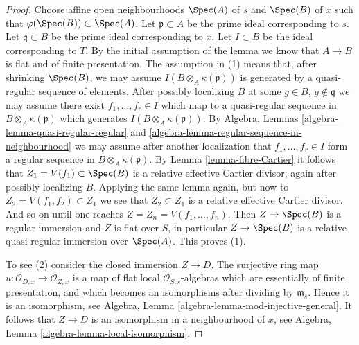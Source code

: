 \begin{proof}
Choose affine open neighbourhoods $\Spec(A)$ of $s$ and
$\Spec(B)$ of $x$ such that
$\varphi(\Spec(B)) \subset \Spec(A)$.
Let $\mathfrak p \subset A$ be the prime ideal corresponding to $s$.
Let $\mathfrak q \subset B$ be the prime ideal corresponding to $x$.
Let $I \subset B$ be the ideal corresponding to $T$.
By the initial assumption of the lemma we know that
$A \to B$ is flat and of finite presentation.
The assumption in (1) means that, after shrinking $\Spec(B)$, we may
assume $I(B \otimes_A \kappa(\mathfrak p))$ is generated by a
quasi-regular sequence of elements. After possibly localizing $B$
at some $g \in B$, $g \not \in \mathfrak q$ we may assume there
exist $f_1, \ldots, f_r \in I$ which map to a quasi-regular
sequence in $B \otimes_A \kappa(\mathfrak p)$ which generates
$I(B \otimes_A \kappa(\mathfrak p))$. By
Algebra, Lemmas \ref{algebra-lemma-quasi-regular-regular} and
\ref{algebra-lemma-regular-sequence-in-neighbourhood}
we may assume after another localization that
$f_1, \ldots, f_r \in I$ form a regular
sequence in $B \otimes_A \kappa(\mathfrak p)$. By
Lemma \ref{lemma-fibre-Cartier}
it follows that $Z_1 = V(f_1) \subset \Spec(B)$
is a relative effective Cartier divisor, again after possibly
localizing $B$. Applying the same lemma again, but now to
$Z_2 = V(f_1, f_2) \subset Z_1$ we see that $Z_2 \subset Z_1$
is a relative effective Cartier divisor. And so on until one
reaches $Z = Z_n = V(f_1, \ldots, f_n)$. Then
$Z \to \Spec(B)$ is a regular immersion and $Z$ is
flat over $S$, in particular $Z \to \Spec(B)$ is
a relative quasi-regular immersion over $\Spec(A)$.
This proves (1).

\medskip\noindent
To see (2) consider the closed immersion $Z \to D$. The surjective
ring map $u : \mathcal{O}_{D, x} \to \mathcal{O}_{Z, x}$
is a map of flat local $\mathcal{O}_{S, s}$-algebras which
are essentially of finite presentation, and which becomes an
isomorphisms after dividing by $\mathfrak m_s$. Hence it is
an isomorphism, see
Algebra, Lemma \ref{algebra-lemma-mod-injective-general}.
It follows that $Z \to D$ is an isomorphism in a neighbourhood
of $x$, see
Algebra, Lemma \ref{algebra-lemma-local-isomorphism}.


\end{proof}
